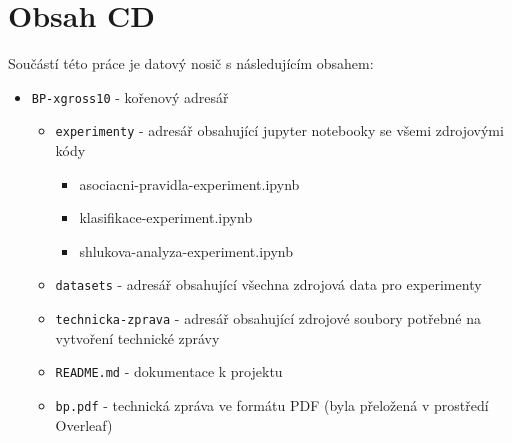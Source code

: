 \chapter{Obsah CD}
Součástí této práce je datový nosič s následujícím obsahem:

\begin{itemize}
    \item \verb|BP-xgross10| - kořenový adresář
    \begin{itemize}
        \item \verb|experimenty| - adresář obsahující jupyter notebooky se všemi zdrojovými kódy
        \begin{itemize}
            \item asociacni-pravidla-experiment.ipynb
            \item klasifikace-experiment.ipynb
            \item shlukova-analyza-experiment.ipynb
        \end{itemize}
        \item \verb|datasets| - adresář obsahující všechna zdrojová data pro experimenty
        \item \verb|technicka-zprava| - adresář obsahující zdrojové soubory potřebné na vytvoření technické zprávy
        \item \verb|README.md| - dokumentace k projektu
        \item \verb|bp.pdf| - technická zpráva ve formátu PDF (byla přeložená v prostředí Overleaf)
    \end{itemize}
\end{itemize}

\label{medium}
